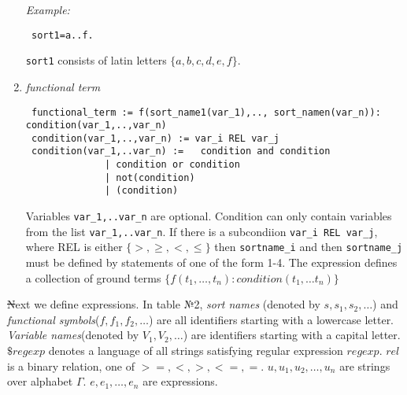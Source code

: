\documentclass[12pt, letterpaper]{article}
\begin{document}
\begin{enumerate}
\textit{Example:}

\begin{verbatim}
 sort1=a..f.
\end{verbatim}
\texttt{sort1} consists of latin letters $\{a,b,c,d,e,f\}$.

\item \textit{functional term}


\begin{verbatim}
 functional_term := f(sort_name1(var_1),.., sort_namen(var_n)): condition(var_1,..,var_n)
 condition(var_1,..,var_n) := var_i REL var_j 
 condition(var_1,..var_n) :=   condition and condition 
              | condition or condition 
              | not(condition) 
              | (condition)
\end{verbatim}
Variables \texttt{var_1,..var_n} are optional.
Condition can only contain variables from the list \texttt{var_1,..var_n}.
If there is a subcondiion \texttt{var_i REL var_j}, where REL is either $\{>,\geq,<,\leq\}$ then \texttt{sortname\_i} and then \texttt{sortname\_j}
must be defined by statements of one of the form 1-4.
The expression defines a collection of ground terms $\{f(t_1,\dots,t_n): condition(t_1,\dots t_n)\}$



\end{enumerate}

\st Next we define expressions. In table №2,  {\em sort names} (denoted by $s,s_1,s_2,\ldots$)
and  {\em functional symbols}($f,f_1,f_2,\ldots$) 
are all  identifiers starting with a lowercase letter. {\em Variable names}(denoted by $V_1,V_2,\ldots$) 
are identifiers starting with a capital letter. $\$regexp$ denotes a language of all strings satisfying regular expression $regexp$.
$rel$ is a binary relation, one of $>=,<,>,<=,=$. $u,u_1,u_2, \ldots , u_n$ are strings over alphabet $\Gamma$.
$e,e_1,\ldots, e_n$ are expressions.
\end{document}
